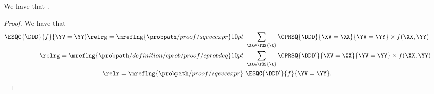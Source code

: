 \begin{proposition}
  We have that \evcdeqprop.%
\end{proposition}

\begin{proof}
  We have that
  \begin{align*}
  \ESQC{\DDD}{f}{\YV = \YY}
  \relrg = {\mreflng{\probpath/proof/sqevcexpr}} 10pt &\ 
  \sum_{\XX \in \TOS{\X}}\CPRSQ{\DDD}{\XV = \XX}{\YV = \YY} \times f(\XX, \YY)\\
  \relrg = {\mreflng{\probpath/definition/cprob/proof/cprobdeq}} 10pt &\ 
  \sum_{\XX \in \TOS{\X}}\CPRSQ{\DDD'}{\XV = \XX}{\YV = \YY} \times f(\XX, \YY)\\
  \relr = {\mreflng{\probpath/proof/sqevcexpr}} &\ 
  \ESQC{\DDD'}{f}{\YV = \YY}.
  \end{align*}
\end{proof}
